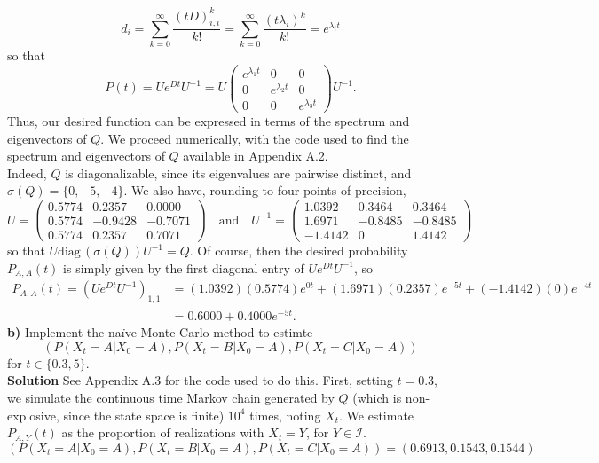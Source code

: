 \documentclass[11pt, letterpaper]{article}
\newcommand{\mc}[1]{\mathcal{#1}}
\begin{document}
    \[d_i=\sum_{k=0}^\infty\frac{(tD)^k_{i,i}}{k!}=\sum_{k=0}^\infty\frac{(t\lambda_i)^k}{k!}=e^{\lambda_it}\]
    so that
    \[P(t)=Ue^{Dt}U^{-1}=U\begin{pmatrix}
        e^{\lambda_1t} & 0 & 0\\
        0 & e^{\lambda_2 t} & 0\\
        0 & 0 & e^{\lambda_3 t}
    \end{pmatrix}U^{-1}.\]
    Thus, our desired function can be expressed in terms of the spectrum and eigenvectors of $Q$. We proceed numerically, with the code used to find the spectrum and eigenvectors of $Q$ available in Appendix A.2.\\[10pt]
    Indeed, $Q$ is diagonalizable, since its eigenvalues are pairwise distinct, and $\sigma(Q)=\{0, -5, -4\}$. We also have, rounding to four points of precision,
    \[U=\begin{pmatrix}
        0.5774 & 0.2357 & 0.0000\\
        0.5774 & -0.9428 & -0.7071\\
        0.5774 &   0.2357 & 0.7071
    \end{pmatrix}\quad\text{and}\quad U^{-1}=\begin{pmatrix}
        1.0392 & 0.3464 & 0.3464\\
        1.6971 & -0.8485 & -0.8485\\
        -1.4142 & 0 & 1.4142
    \end{pmatrix}\]
    so that $U\text{diag}\,(\sigma(Q))U^{-1}=Q$. Of course, then the desired probability $P_{A,A}(t)$ is simply given by the first diagonal entry of $Ue^{Dt}U^{-1}$, so
    \begin{align*}
        P_{A,A}(t)=(Ue^{Dt}U^{-1})_{1,1}&=(1.0392)(0.5774)e^{0t}+(1.6971)(0.2357)e^{-5t}+(-1.4142)(0)e^{-4t}\\
        &=0.6000+0.4000e^{-5t}.\tag*{$\qed$}
    \end{align*}
    {\bf b)} Implement the na\"ive Monte Carlo method to estimte 
    \[(P(X_t=A|X_0=A), P(X_t=B|X_0=A), P(X_t=C|X_0=A))\]
    for $t\in\{0.3, 5\}$.\\[10pt]
    {\bf Solution} See Appendix A.3 for the code used to do this. First, setting $t=0.3$, we simulate the continuous time Markov chain
    generated by $Q$ (which is non-explosive, since the state space is finite) $10^4$ times, noting $X_t$. We estimate $P_{A,Y}(t)$ as the proportion
    of realizations with $X_t=Y$, for $Y\in\mc{I}$.
    \[(P(X_t=A|X_0=A), P(X_t=B|X_0=A), P(X_t=C|X_0=A))=(0.6913, 0.1543, 0.1544)\]
\end{document}
